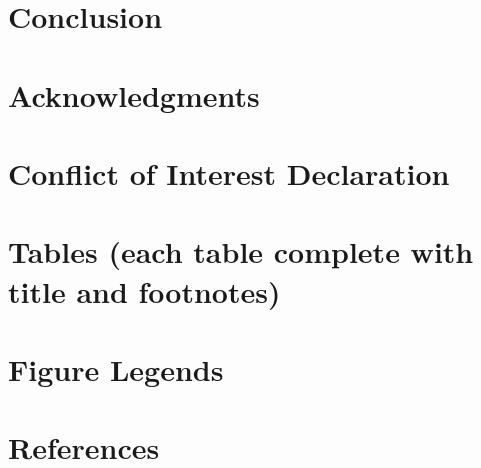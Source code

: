 \documentclass[
  12pt,
  a4paper,
]{article}
\begin{document}
\hypertarget{conclusion}{%
\section{Conclusion}\label{conclusion}}

\hypertarget{acknowledgments}{%
\section{Acknowledgments}\label{acknowledgments}}

\hypertarget{conflict-of-interest-declaration}{%
\section{Conflict of Interest
Declaration}\label{conflict-of-interest-declaration}}

\hypertarget{tables-each-table-complete-with-title-and-footnotes}{%
\section{Tables (each table complete with title and
footnotes)}\label{tables-each-table-complete-with-title-and-footnotes}}

\hypertarget{figure-legends}{%
\section{Figure Legends}\label{figure-legends}}

\hypertarget{references}{%
\section*{References}\label{references}}
\end{document}
